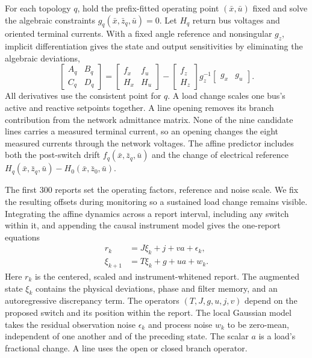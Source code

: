 For each topology $q$, hold the prefix-fitted operating point
$(\bar x,\bar u)$ fixed and solve the algebraic constraints
$g_q(\bar x,\bar z_q,\bar u)=0$. Let $H_q$ return bus voltages and
oriented terminal currents. With a fixed angle reference and nonsingular
$g_z$, implicit differentiation gives the state and output sensitivities
by eliminating the algebraic deviations,
\begin{equation}
 \begin{bmatrix} A_q & B_q \\ C_q & D_q \end{bmatrix}
 =
 \begin{bmatrix} f_x & f_u \\ H_x & H_u \end{bmatrix}
 -\begin{bmatrix}f_z\\H_z\end{bmatrix}
    g_z^{-1}\begin{bmatrix}g_x & g_u\end{bmatrix}.
 \label{eq:narrative-reduction}
\end{equation}
All derivatives use the consistent point for $q$. A load change scales
one bus's active and reactive setpoints together. A line opening removes
its branch contribution from the network admittance matrix. None of the
nine candidate lines carries a measured terminal current, so an opening
changes the eight measured currents through the network voltages. The
affine predictor includes both the post-switch drift
$f_q(\bar x,\bar z_q,\bar u)$ and the change of electrical reference
$H_q(\bar x,\bar z_q,\bar u)-H_0(\bar x,\bar z_0,\bar u)$.

The first 300 reports set the operating factors, reference and noise scale.
We fix the resulting offsets during monitoring so a sustained load
change remains visible. Integrating the affine dynamics across a report
interval, including any switch within it, and appending the causal
instrument model gives the one-report equations
\begin{align}
 r_k &= J\xi_k+j+v a+\epsilon_k,\nonumber\\
 \xi_{k+1} &= T\xi_k+g+u a+w_k .
 \label{eq:implemented-predictor}
\end{align}
Here $r_k$ is the centered, scaled and instrument-whitened report.
The augmented state $\xi_k$ contains the physical deviations, phase
and filter memory, and an autoregressive discrepancy term. The
operators $(T,J,g,u,j,v)$ depend on the proposed switch and its
position within the report. The local Gaussian model takes the residual
observation noise $\epsilon_k$ and process noise $w_k$ to be zero-mean,
independent of one another and of the preceding state. The scalar $a$ is
a load's fractional change. A line uses the open or closed branch operator.

